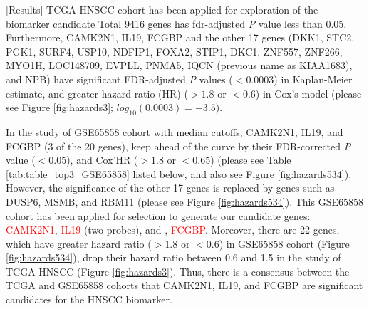 \documentclass[preprint,12pt]{elsarticle}
\newenvironment{MyColorPar}[1]{%
    \leavevmode\color{#1}\ignorespaces%
}{%
}%
\begin{document}
\begin{MyColorPar}{blue}
\begin{MyColorPar}{red}
[Results]
TCGA HNSCC cohort has been applied for exploration of the biomarker candidate
Total 9416 genes has \acrshort{fdr}-adjusted \textit{P} value less than 0.05.
Furthermore, CAMK2N1, IL19, FCGBP and the other 17 genes (DKK1, STC2, PGK1, SURF4, USP10, NDFIP1, FOXA2, STIP1, DKC1, ZNF557, ZNF266, MYO1H, LOC148709, EVPLL, PNMA5, IQCN (previous name as KIAA1683), and NPB) have significant FDR-adjusted \textit{P} values ($<0.0003$) in Kaplan-Meier estimate, and greater hazard ratio (HR) ($> 1.8$ or $< 0.6$) in Cox's model (please see Figure \ref{fig:hazards3}; $log_{10}(0.0003)=-3.5$).

In the study of GSE65858 cohort with median cutoffs, CAMK2N1, IL19, and FCGBP (3 of the 20 genes), keep ahead of the curve by their FDR-corrected \textit{P} value ($< 0.05$), and Cox'HR ($>1.8$ or $<0.65$) (please see Table \ref{tab:table_top3_GSE65858} listed below,
and also see Figure \ref{fig:hazards534}).
However, the significance of the other 17 genes is replaced by genes such as DUSP6, MSMB, and RBM11 (please see Figure \ref{fig:hazards534}).
This GSE65858 cohort has been applied for selection to generate our candidate genes: \textcolor{red}{CAMK2N1}, \textcolor{red}{IL19} (two probes), and , \textcolor{red}{FCGBP}.
Moreover, there are 22 genes, which have greater hazard ratio ($> 1.8$ or $< 0.6$) in GSE65858 cohort (Figure \ref{fig:hazards534}), drop their hazard ratio between 0.6 and 1.5 in the study of TCGA HNSCC (Figure \ref{fig:hazards3}).
Thus, there is a consensus between the TCGA and GSE65858 cohorts that CAMK2N1, IL19, and FCGBP are significant candidates for the HNSCC biomarker.



\end{MyColorPar}
\end{MyColorPar}
\end{document}
